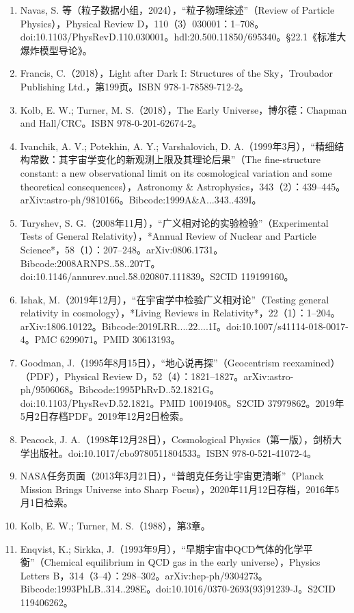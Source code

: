 \begin{enumerate}
\item Navas, S. 等（粒子数据小组，2024），“粒子物理综述”（Review of Particle Physics），Physical Review D，110（3）030001：1–708。doi:10.1103/PhysRevD.110.030001。hdl:20.500.11850/695340。§22.1《标准大爆炸模型导论》。  
\item Francis, C.（2018），Light after Dark I: Structures of the Sky，Troubador Publishing Ltd.，第199页。ISBN 978-1-78589-712-2。  
\item Kolb, E. W.; Turner, M. S.（2018），The Early Universe，博尔德：Chapman and Hall/CRC。ISBN 978-0-201-62674-2。  
\item Ivanchik, A. V.; Potekhin, A. Y.; Varshalovich, D. A.（1999年3月），“精细结构常数：其宇宙学变化的新观测上限及其理论后果”（The fine-structure constant: a new observational limit on its cosmological variation and some theoretical consequences），Astronomy & Astrophysics，343（2）：439–445。arXiv:astro-ph/9810166。Bibcode:1999A&A...343..439I。  
\item Turyshev, S. G.（2008年11月），“广义相对论的实验检验”（Experimental Tests of General Relativity），*Annual Review of Nuclear and Particle Science*，58（1）：207–248。arXiv:0806.1731。Bibcode:2008ARNPS..58..207T。doi:10.1146/annurev.nucl.58.020807.111839。S2CID 119199160。  
\item Ishak, M.（2019年12月），“在宇宙学中检验广义相对论”（Testing general relativity in cosmology），*Living Reviews in Relativity*，22（1）：1–204。arXiv:1806.10122。Bibcode:2019LRR....22....1I。doi:10.1007/s41114-018-0017-4。PMC 6299071。PMID 30613193。  
\item Goodman, J.（1995年8月15日），“地心说再探”（Geocentrism reexamined）（PDF），Physical Review D，52（4）：1821–1827。arXiv:astro-ph/9506068。Bibcode:1995PhRvD..52.1821G。doi:10.1103/PhysRevD.52.1821。PMID 10019408。S2CID 37979862。2019年5月2日存档PDF。2019年12月2日检索。  
\item Peacock, J. A.（1998年12月28日），Cosmological Physics（第一版），剑桥大学出版社。doi:10.1017/cbo9780511804533。ISBN 978-0-521-41072-4。  
\item NASA任务页面（2013年3月21日），“普朗克任务让宇宙更清晰”（Planck Mission Brings Universe into Sharp Focus），2020年11月12日存档，2016年5月1日检索。
\item Kolb, E. W.; Turner, M. S.（1988），第3章。  
\item Enqvist, K.; Sirkka, J.（1993年9月），“早期宇宙中QCD气体的化学平衡”（Chemical equilibrium in QCD gas in the early universe），Physics Letters B，314（3–4）：298–302。arXiv:hep-ph/9304273。Bibcode:1993PhLB..314..298E。doi:10.1016/0370-2693(93)91239-J。S2CID 119406262。  

\end{enumerate}
